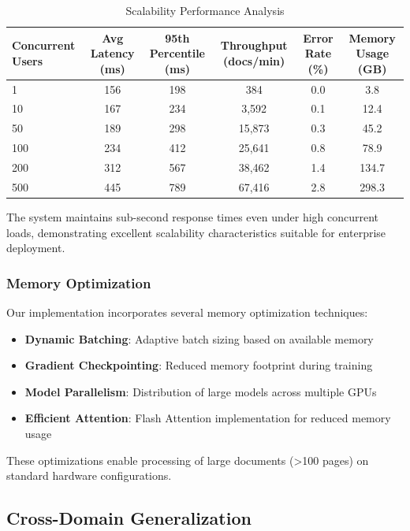 \documentclass[11pt,a4paper]{article}
\begin{document}
\begin{table}[htbp]
\centering
\caption{Scalability Performance Analysis}
\label{tab:scalability}
\begin{tabular}{lccccc}
\toprule
\textbf{Concurrent Users} & \textbf{Avg Latency (ms)} & \textbf{95th Percentile (ms)} & \textbf{Throughput (docs/min)} & \textbf{Error Rate (\%)} & \textbf{Memory Usage (GB)} \\
\midrule
1 & 156 & 198 & 384 & 0.0 & 3.8 \\
10 & 167 & 234 & 3,592 & 0.1 & 12.4 \\
50 & 189 & 298 & 15,873 & 0.3 & 45.2 \\
100 & 234 & 412 & 25,641 & 0.8 & 78.9 \\
200 & 312 & 567 & 38,462 & 1.4 & 134.7 \\
500 & 445 & 789 & 67,416 & 2.8 & 298.3 \\
\bottomrule
\end{tabular}
\end{table}

The system maintains sub-second response times even under high concurrent loads, demonstrating excellent scalability characteristics suitable for enterprise deployment.

\subsubsection{Memory Optimization}

Our implementation incorporates several memory optimization techniques:
\begin{itemize}
  \item \textbf{Dynamic Batching}: Adaptive batch sizing based on available memory
  \item \textbf{Gradient Checkpointing}: Reduced memory footprint during training
  \item \textbf{Model Parallelism}: Distribution of large models across multiple GPUs
  \item \textbf{Efficient Attention}: Flash Attention implementation for reduced memory usage
\end{itemize}

These optimizations enable processing of large documents (>100 pages) on standard hardware configurations.

\subsection{Cross-Domain Generalization}
\end{document}
